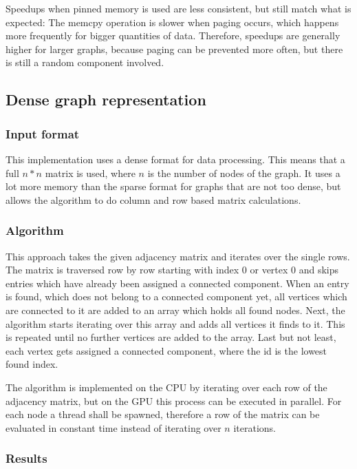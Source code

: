 \documentclass[letta4 paper]{article}
\numberwithin{equation}{section}
\newcommand{\0}{\mathbf{0}}
\begin{document}
Speedups when pinned memory is used are less consistent, but still match what is expected: The memcpy operation is slower when paging occurs, which happens more frequently for bigger quantities of data. Therefore, speedups are generally higher for larger graphs, because paging can be prevented more often, but there is still a random component involved.


\subsection{Dense graph representation}
\subsubsection{Input format} \label{dense_graph_input_format}

This implementation uses a dense format for data processing. This means that a full $n*n$ matrix is used, where $n$ is the number of nodes of the graph. It uses a lot more memory than the sparse format for graphs that are not too dense, but allows the algorithm to do column and row based matrix calculations.

\subsubsection{Algorithm}

This approach takes the given adjacency matrix and iterates over the single rows. The matrix is traversed row by row starting with index 0 or vertex 0 and skips entries which have already been assigned a connected component. When an entry is found, which does not belong to a connected component yet, all vertices which are connected to it are added to an array which holds all found nodes. Next, the algorithm starts iterating over this array and adds all vertices it finds to it. This is repeated until no further vertices are added to the array. Last but not least, each vertex gets assigned a connected component, where the id is the lowest found index.

The algorithm is implemented on the CPU by iterating over each row of the adjacency matrix, but on the GPU this process can be executed in parallel. For each node a thread shall be spawned, therefore a row of the matrix can be evaluated in constant time instead of iterating over $n$ iterations. 

\subsubsection{Results}
\end{document}

